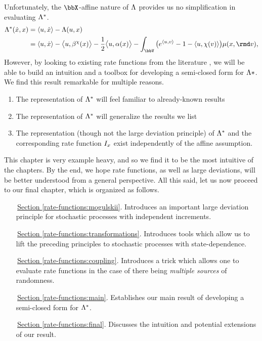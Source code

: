 Unfortunately, the $\stateSpace$-affine nature of $\Lambda$ provides us no simplification in evaluating $\Lambda^*$.
\begin{align*}
  \ode^*(\diffVar, \stateVar) 
  &= \prj{\momentVar}{\diffVar} - \ode(\momentVar, \stateVar)  \\
  &= \prj{\momentVar}{\diffVar} -  \bprj{\momentVar}{\affDrift^\trunc(\stateVar)} - \frac12\bprj{\momentVar}{\affDiff(\stateVar)} - \int_\vecSpace \big( e^\prj{\momentVar}{\markVar} - 1 - \prj{\momentVar}{\trunc(\markVar)} \big) \affJump(\stateVar, \rmd\markVar),
\end{align*}
However, by looking to existing rate functions from the literature \cite{duffy2004,dembo2010,kang2014,gao2018b}, we will be able to build an intuition and a toolbox for developing a semi-closed form for $\Lambda*$.
We find this result remarkable for multiple reasons.
\begin{enumerate}
  \item
    The representation of $\Lambda^*$ will feel familiar to already-known results
  \item
    The representation of $\Lambda^*$ will generalize the results we list
  \item
    The representation (though not the large deviation principle) of $\Lambda^*$ and the corresponding rate function $I_x$ exist independently of the affine assumption.
\end{enumerate}
This chapter is very example heavy, and so we find it to be the most intuitive of the chapters.
By the end, we hope rate functions, as well as large deviations, will be better understood from a general perspective.
All this said, let us now proceed to our final chapter, which is organized as follows.

\begin{enumerate}[leftmargin=20mm]
  \item[\,{\hyperref[rate-functions:mogulskii]{Section }}\ref{rate-functions:mogulskii}.]
    Introduces an important large deviation principle for stochastic processes with independent increments.
  \item[\,{\hyperref[rate-functions:transformations]{Section }}\ref{rate-functions:transformations}.]
    Introduces tools which allow us to lift the preceding principles to stochastic processes with state-dependence.
  \item[\,{\hyperref[rate-functions:coupling]{Section }}\ref{rate-functions:coupling}.]
    Introduces a trick which allows one to evaluate rate functions in the case of there being \emph{multiple sources} of randomness.
  \item[\,{\hyperref[rate-functions:main]{Section }}\ref{rate-functions:main}.]
    Establishes our main result of developing a semi-closed form for $\Lambda^*$.
  \item[\,{\hyperref[rate-functions:final]{Section }}\ref{rate-functions:final}.]
    Discusses the intuition and potential extensions of our result.
\end{enumerate}

